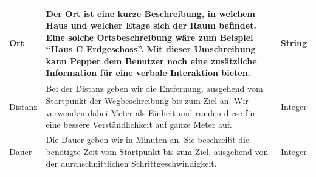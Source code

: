 \begin{tabular}{| l | p{9.45cm} | c| }
    Ort                                                                                                                                                                                                                                                                                                                                                                                                                                                                                                                                                             & \small Der Ort ist eine kurze Beschreibung, in welchem Haus und welcher Etage sich der Raum befindet. Eine solche Ortsbeschreibung wäre zum Beispiel “Haus C Erdgeschoss”. Mit dieser Umschreibung kann Pepper dem Benutzer noch eine zusätzliche Information für eine verbale Interaktion bieten. & String   \\
    \hline
    Distanz                                                                                                                                                                                                                                                                                                                                                                                                                                                                                                                                                         & \small Bei der Distanz geben wir die Entfernung, ausgehend vom Startpunkt der Wegbeschreibung bis zum Ziel an. Wir verwenden dabei Meter als Einheit und runden diese für eine bessere Verständlichkeit auf ganze Meter auf.                                                                       & Integer  \\
    \hline
    Dauer                                                                                                                                                                                                                                                                                                                                                                                                                                                                                                                                                           & \small Die Dauer geben wir in Minuten an. Sie beschreibt die benötigte Zeit vom Startpunkt bis zum Ziel, ausgehend von der durchschnittlichen Schrittgeschwindigkeit.                                                                                                                              & Integer  \\
    \hline
\end{tabular} \vspace{5mm}

